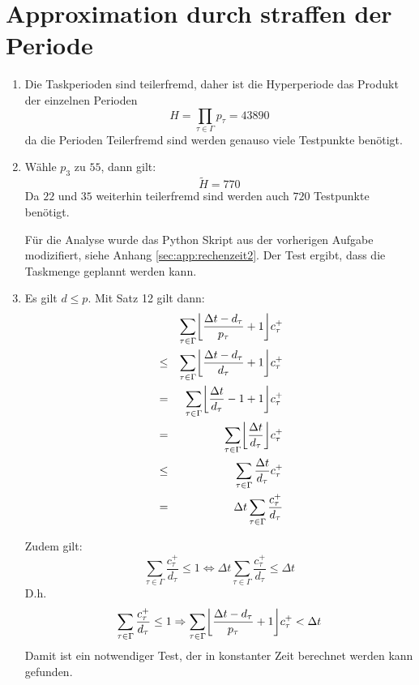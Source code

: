 \documentclass[DIN, pagenumber=false, fontsize=11pt, parskip=half]{scrartcl}
\DeclarePairedDelimiter\floor{\lfloor}{\rfloor}
\begin{document}
    \section{Approximation durch straffen der Periode}
    \begin{enumerate}[label=\alph*)]
        \item
            Die Taskperioden sind teilerfremd, daher ist die Hyperperiode das Produkt
            der einzelnen Perioden
            \begin{equation}
                H = \prod_{\tau \in \Gamma} p_\tau = 43890
            \end{equation}
            da die Perioden Teilerfremd sind werden genauso viele Testpunkte benötigt.
        \item
            Wähle $p_3$ zu $55$, dann gilt:
            \begin{equation}
                \tilde{H} = 770
            \end{equation}
            Da $22$ und $35$ weiterhin teilerfremd sind werden auch $720$ Testpunkte
            benötigt.

            Für die Analyse wurde das Python Skript aus der vorherigen Aufgabe modizifiert,
            siehe Anhang \ref{sec:app:rechenzeit2}. Der Test ergibt, dass die Taskmenge
            geplannt werden kann.
        \item
            Es gilt $d \leq p$. Mit Satz 12 gilt dann:
            \begin{eqnarray}
                && \sum_{\tau \in \Gamma} \floor*{\frac{\Delta t - d_\tau}{p_\tau} + 1} c^+_\tau\\
                &\leq& \sum_{\tau \in \Gamma} \floor*{\frac{\Delta t - d_\tau}{d_\tau} + 1} c^+_\tau\\
                &=& \sum_{\tau \in \Gamma} \floor*{\frac{\Delta t}{d_\tau} - 1 + 1} c^+_\tau\\
                &=& \sum_{\tau \in \Gamma} \floor*{\frac{\Delta t}{d_\tau}} c^+_\tau\\
                &\leq& \sum_{\tau \in \Gamma} \frac{\Delta t}{d_\tau} c^+_\tau\\
                &=& \Delta t \sum_{\tau \in \Gamma} \frac{c^+_\tau}{d_\tau}\\
            \end{eqnarray}

            Zudem gilt:
            \begin{equation}
                \sum_{\tau \in \Gamma} \frac{c^+_\tau}{d_\tau} \leq 1 \Leftrightarrow
                \Delta t \sum_{\tau \in \Gamma} \frac{c^+_\tau}{d_\tau} \leq \Delta t
            \end{equation}
            D.h.
            \begin{equation}
                \sum_{\tau \in \Gamma} \frac{c^+_\tau}{d_\tau} \leq 1 \Rightarrow
                \sum_{\tau \in \Gamma} \floor*{\frac{\Delta t - d_\tau}{p_\tau} + 1} c^+_\tau < 
                \Delta t
            \end{equation}
            Damit ist ein notwendiger Test, der in konstanter Zeit berechnet werden kann gefunden.


\end{enumerate}
\end{document}
